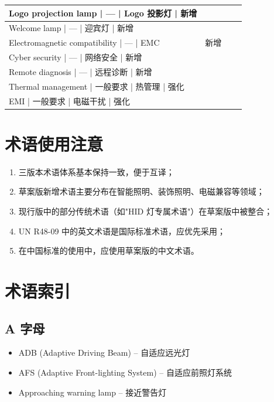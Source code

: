 \begin{table}[H]
\begin{tabularx}{\textwidth}{|X|X|X|X|}
Logo projection lamp  | ---        | Logo 投影灯   | 新增 \\
\hline
Welcome lamp        | ---        | 迎宾灯       | 新增 \\
\hline
Electromagnetic compatibility | ---      | EMC       & 新增 \\
\hline
Cyber security       | ---        | 网络安全     | 新增 \\
\hline
Remote diagnosis     | ---        | 远程诊断     | 新增 \\
\hline
Thermal management   | 一般要求    | 热管理       | 强化 \\
\hline
EMI               | 一般要求    | 电磁干扰     | 强化 \\
\hline
\end{tabularx}
\end{table}

\section{术语使用注意}

\begin{enumerate}[leftmargin=2em]
    \item 三版本术语体系基本保持一致，便于互译；
    \item 草案版新增术语主要分布在智能照明、装饰照明、电磁兼容等领域；
    \item 现行版中的部分传统术语（如"HID 灯专属术语"）在草案版中被整合；
    \item UN R48-09 中的英文术语是国际标准术语，应优先采用；
    \item 在中国标准的使用中，应使用草案版的中文术语。
\end{enumerate}

\section{术语索引}

\subsection{A 字母}

\begin{itemize}[leftmargin=2em]
    \item ADB (Adaptive Driving Beam) -- 自适应远光灯
    \item AFS (Adaptive Front-lighting System) -- 自适应前照灯系统
    \item Approaching warning lamp -- 接近警告灯
\end{itemize}

